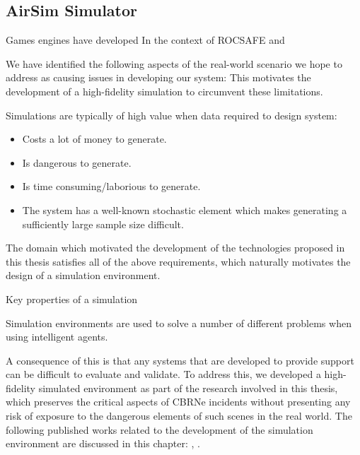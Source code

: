 \subsection{AirSim Simulator}



Games engines have developed
In the context of ROCSAFE and 



We have identified the following aspects of the real-world scenario we hope to address as causing issues in developing our system:
This motivates the development of a high-fidelity simulation to circumvent these limitations.



Simulations are typically of high value when data required to design system:
\begin{itemize}
    \item Costs a lot of money to generate.
    \item Is dangerous to generate.
    \item Is time consuming/laborious to generate.
    \item The system has a well-known stochastic element which makes generating a sufficiently large sample size difficult.
\end{itemize}
The domain which motivated the development of the technologies proposed in this thesis satisfies all of the above requirements, which naturally motivates the design of a simulation environment. \par

 Key properties of a simulation 


Simulation environments are used to solve a number of different problems when using intelligent agents.

A consequence of this is that any systems that are developed to provide support can be difficult to evaluate and validate. To address this, we developed a high-fidelity simulated environment as part of the research involved in this thesis, which preserves the critical aspects of CBRNe incidents without presenting any risk of exposure to the dangerous elements of such scenes in the real world. The following published works related to the development of the simulation environment are discussed in this chapter: \citet{Smyth2018AInvestigation}, \citet{Smyth2018UsingDrones}.\par


